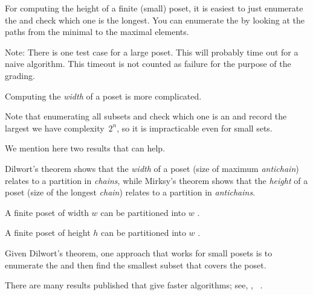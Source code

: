 

\begin{hint}
    For computing the height of a finite (small) poset, it is easiest to just enumerate the   and check which one is the longest.
    You can enumerate the   by looking at the paths from the minimal to the maximal elements.
\end{hint}

Note: There is one test case for a large poset.
This will probably time out for a naive algorithm.
This timeout is not counted as failure for the purpose of the grading.

\begin{hint}
    Computing the \emph{width} of a poset is more complicated.

    Note that enumerating all subsets and check which one is an    and record the largest we have complexity~$2^n$, so it is impracticable even for small sets.

    We mention here two results that can help.

    Dilwort's theorem shows that the \emph{width} of a poset (size of maximum \emph{antichain}) relates to a partition in \emph{chains}, while Mirksy's theorem shows that the \emph{height} of a poset (size of the longest \emph{chain}) relates to a partition in \emph{antichains}.

    \begin{theorem}
        \label{thm:dilwort}
        A finite poset of width $w$ can be partitioned into $w$ .
    \end{theorem}

    \begin{theorem}
        \label{thm:mirsky}
        A finite poset of height $h$ can be partitioned into $w$ .
    \end{theorem}

    Given Dilwort's theorem, one approach that works for small posets is to enumerate the   and then find the smallest subset that covers the poset.

    There are many results published that give faster algorithms; see, \eg, ~\cite{chen12decomposition}.

\end{hint}

